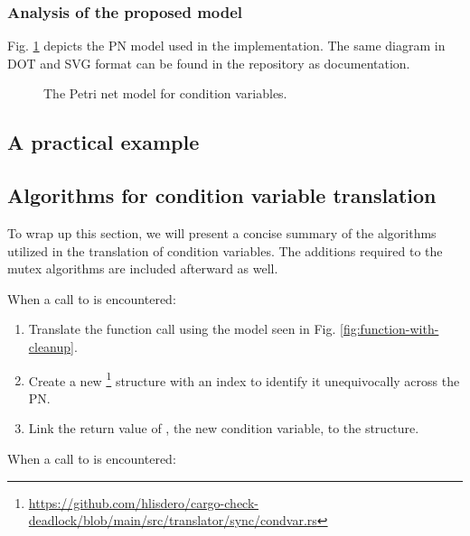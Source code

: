 \subsubsection{Analysis of the proposed model}

Fig. \ref{fig:condition-variable-model} depicts
the \acrshort{PN} model used in the implementation.
The same diagram in DOT and SVG format
can be found in the repository as documentation.

\begin{figure}[!htbp]
      \centering
      
      \caption{The Petri net model for condition variables.}
      \label{fig:condition-variable-model}
\end{figure}

\subsection{A practical example}

\subsection{Algorithms for condition variable translation}
\label{sec:condvar-algorithms}

To wrap up this section, we will present a concise summary
of the algorithms utilized in the translation of condition variables.
The additions required to the mutex algorithms are included afterward as well.

When a call to  is encountered:

\begin{enumerate}
      \item Translate the function call using the model seen in Fig. \ref{fig:function-with-cleanup}.
      \item Create a new \footnote{\url{https://github.com/hlisdero/cargo-check-deadlock/blob/main/src/translator/sync/condvar.rs}}
            structure with an index to identify it unequivocally across the \acrshort{PN}.
      \item Link the return value of ,
            the new condition variable, to the  structure.
\end{enumerate}

When a call to  is encountered:

